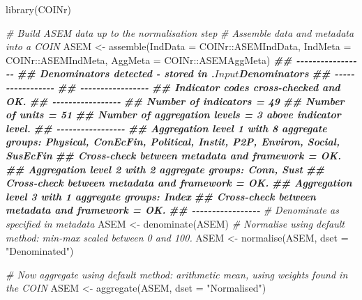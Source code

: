 \documentclass[
]{book}
\newenvironment{Shaded}{\begin{snugshade}}{\end{snugshade}}
\newcommand{\AttributeTok}[1]{\textcolor[rgb]{0.77,0.63,0.00}{#1}}
\newcommand{\CommentTok}[1]{\textcolor[rgb]{0.56,0.35,0.01}{\textit{#1}}}
\newcommand{\DocumentationTok}[1]{\textcolor[rgb]{0.56,0.35,0.01}{\textbf{\textit{#1}}}}
\newcommand{\FunctionTok}[1]{\textcolor[rgb]{0.00,0.00,0.00}{#1}}
\newcommand{\NormalTok}[1]{#1}
\newcommand{\OtherTok}[1]{\textcolor[rgb]{0.56,0.35,0.01}{#1}}
\newcommand{\SpecialCharTok}[1]{\textcolor[rgb]{0.00,0.00,0.00}{#1}}
\newcommand{\StringTok}[1]{\textcolor[rgb]{0.31,0.60,0.02}{#1}}
\begin{document}
\begin{Shaded}
\begin{Highlighting}[]
\FunctionTok{library}\NormalTok{(COINr)}

\CommentTok{\# Build ASEM data up to the normalisation step}
\CommentTok{\# Assemble data and metadata into a COIN}
\NormalTok{ASEM }\OtherTok{\textless{}{-}} \FunctionTok{assemble}\NormalTok{(}\AttributeTok{IndData =}\NormalTok{ COINr}\SpecialCharTok{::}\NormalTok{ASEMIndData, }\AttributeTok{IndMeta =}\NormalTok{ COINr}\SpecialCharTok{::}\NormalTok{ASEMIndMeta, }\AttributeTok{AggMeta =}\NormalTok{ COINr}\SpecialCharTok{::}\NormalTok{ASEMAggMeta)}
\DocumentationTok{\#\# {-}{-}{-}{-}{-}{-}{-}{-}{-}{-}{-}{-}{-}{-}{-}{-}{-}}
\DocumentationTok{\#\# Denominators detected {-} stored in .$Input$Denominators}
\DocumentationTok{\#\# {-}{-}{-}{-}{-}{-}{-}{-}{-}{-}{-}{-}{-}{-}{-}{-}{-}}
\DocumentationTok{\#\# {-}{-}{-}{-}{-}{-}{-}{-}{-}{-}{-}{-}{-}{-}{-}{-}{-}}
\DocumentationTok{\#\# Indicator codes cross{-}checked and OK.}
\DocumentationTok{\#\# {-}{-}{-}{-}{-}{-}{-}{-}{-}{-}{-}{-}{-}{-}{-}{-}{-}}
\DocumentationTok{\#\# Number of indicators = 49}
\DocumentationTok{\#\# Number of units = 51}
\DocumentationTok{\#\# Number of aggregation levels = 3 above indicator level.}
\DocumentationTok{\#\# {-}{-}{-}{-}{-}{-}{-}{-}{-}{-}{-}{-}{-}{-}{-}{-}{-}}
\DocumentationTok{\#\# Aggregation level 1 with 8 aggregate groups: Physical, ConEcFin, Political, Instit, P2P, Environ, Social, SusEcFin}
\DocumentationTok{\#\# Cross{-}check between metadata and framework = OK.}
\DocumentationTok{\#\# Aggregation level 2 with 2 aggregate groups: Conn, Sust}
\DocumentationTok{\#\# Cross{-}check between metadata and framework = OK.}
\DocumentationTok{\#\# Aggregation level 3 with 1 aggregate groups: Index}
\DocumentationTok{\#\# Cross{-}check between metadata and framework = OK.}
\DocumentationTok{\#\# {-}{-}{-}{-}{-}{-}{-}{-}{-}{-}{-}{-}{-}{-}{-}{-}{-}}
\CommentTok{\# Denominate as specified in metadata}
\NormalTok{ASEM }\OtherTok{\textless{}{-}} \FunctionTok{denominate}\NormalTok{(ASEM)}
\CommentTok{\# Normalise using default method: min{-}max scaled between 0 and 100.}
\NormalTok{ASEM }\OtherTok{\textless{}{-}} \FunctionTok{normalise}\NormalTok{(ASEM, }\AttributeTok{dset =} \StringTok{"Denominated"}\NormalTok{)}

\CommentTok{\# Now aggregate using default method: arithmetic mean, using weights found in the COIN}
\NormalTok{ASEM }\OtherTok{\textless{}{-}} \FunctionTok{aggregate}\NormalTok{(ASEM, }\AttributeTok{dset =} \StringTok{"Normalised"}\NormalTok{)}


\end{Highlighting}
\end{Shaded}
\end{document}
